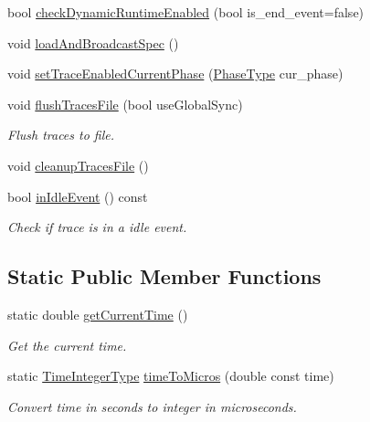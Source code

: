 \begin{DoxyCompactItemize}
bool \hyperlink{structvt_1_1trace_1_1_trace_a995bc2b464af735323a4c07f10b5c55b}{check\+Dynamic\+Runtime\+Enabled} (bool is\+\_\+end\+\_\+event=false)
\item 
void \hyperlink{structvt_1_1trace_1_1_trace_a06f74f8d2c0c2fb97be14a264fd36a45}{load\+And\+Broadcast\+Spec} ()
\item 
void \hyperlink{structvt_1_1trace_1_1_trace_aa2740411eec8e1dabf10d60f48193e69}{set\+Trace\+Enabled\+Current\+Phase} (\hyperlink{namespacevt_a46ce6733d5cdbd735d561b7b4029f6d7}{Phase\+Type} cur\+\_\+phase)
\item 
void \hyperlink{structvt_1_1trace_1_1_trace_a2e07094a48c47b9c591003f0b57305c7}{flush\+Traces\+File} (bool use\+Global\+Sync)
\begin{DoxyCompactList}\small\item\em Flush traces to file. \end{DoxyCompactList}\item 
void \hyperlink{structvt_1_1trace_1_1_trace_ac764c356a7f81abadfe643d618f22b15}{cleanup\+Traces\+File} ()
\item 
bool \hyperlink{structvt_1_1trace_1_1_trace_a1e7429d95dbddd9f235a02800d158d36}{in\+Idle\+Event} () const
\begin{DoxyCompactList}\small\item\em Check if trace is in a idle event. \end{DoxyCompactList}\end{DoxyCompactItemize}
\subsection*{Static Public Member Functions}
\begin{DoxyCompactItemize}
\item 
static double \hyperlink{structvt_1_1trace_1_1_trace_a04cf6b76b4ced1bc90d246a34c948db5}{get\+Current\+Time} ()
\begin{DoxyCompactList}\small\item\em Get the current time. \end{DoxyCompactList}\item 
static \hyperlink{structvt_1_1trace_1_1_trace_ab8db9218a8ab87f59773fcbf81433787}{Time\+Integer\+Type} \hyperlink{structvt_1_1trace_1_1_trace_a4f271a172e5b1d3bfe7f61d9443b9146}{time\+To\+Micros} (double const time)
\begin{DoxyCompactList}\small\item\em Convert time in seconds to integer in microseconds. \end{DoxyCompactList}\end{DoxyCompactItemize}

